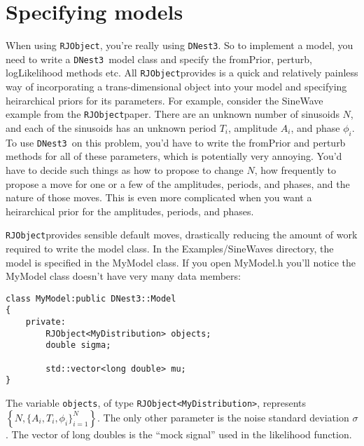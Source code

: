 \documentclass[a4paper, 11pt]{article}
\newcommand{\rjobject}{{\tt RJObject}}
\newcommand{\dnest}{{\tt DNest3}}
\begin{document}
\section{Specifying models}
When using \rjobject, you're really using \dnest. So to implement a model, you
need to write a \dnest~model class and specify the fromPrior, perturb,
logLikelihood methods etc. All \rjobject provides is a quick and relatively
painless way of incorporating a trans-dimensional object into your model and
specifying heirarchical priors for its parameters. For example, consider
the SineWave example from the \rjobject paper. There are an unknown number of
sinusoids $N$, and each of the sinusoids has an unknown period $T_i$, amplitude
$A_i$, and phase $\phi_i$. To use \dnest~on this problem, you'd have to write
the fromPrior and perturb methods for all of these parameters, which is
potentially very annoying. You'd have to decide such things as how to propose
to change $N$, how frequently to propose a move for one or a few of the
amplitudes, periods, and phases, and the nature of those moves. This is even
more complicated when you want a heirarchical prior for the amplitudes, periods,
and phases.

\rjobject provides sensible default moves, drastically reducing the amount of
work required to write the model class. In the Examples/SineWaves directory,
the model is specified in the MyModel class. If you open MyModel.h you'll
notice the MyModel class doesn't have very many data members:

\begin{framed}
\begin{verbatim}
class MyModel:public DNest3::Model
{
    private:
        RJObject<MyDistribution> objects;
        double sigma;

        std::vector<long double> mu;
}
\end{verbatim}
\end{framed}

The variable {\tt objects}, of type {\tt RJObject<MyDistribution>}, represents
$\left\{N, \{A_i, T_i, \phi_i\}_{i=1}^N\right\}$. The only other parameter
is the noise standard deviation $\sigma$. The vector of long doubles is
the ``mock signal'' used in the likelihood function.
\end{document}
